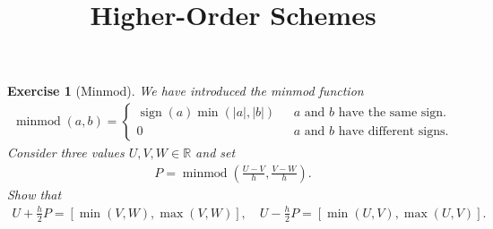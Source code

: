 \documentclass[10pt,letterpaper]{article}
\newcommand{\minmod}{\operatorname{minmod}}
\newcommand{\sign}{\operatorname{sign}}
\theoremstyle{break}
\newtheorem{exercise}{Exercise}
\begin{document}
\title{Higher-Order Schemes}
\date{}

\maketitle











\begin{exercise}[Minmod]
    We have introduced the minmod function
    \begin{align}
    \minmod(a,b)
        = 
        \begin{cases}
            \sign(a) \min(|a|,|b|) & \text{ $a$ and $b$ have the same sign.}
            \\
            0                      & \text{ $a$ and $b$ have different signs.}
    \end{cases}
    \end{align}
    Consider three values $U, V, W \in \mathbb R$ and set 
    \begin{align}
        P = \minmod\left( \frac{U-V}{h}, \frac{V-W}{h} \right)
        .
    \end{align}
    Show that 
    \begin{align}
     U + \frac h 2 P = \left[ \min(V,W), \max(V,W) \right]
     ,
     \quad 
     U - \frac h 2 P = \left[ \min(U,V), \max(U,V) \right]
     .
    \end{align}
\end{exercise}
\end{document}
